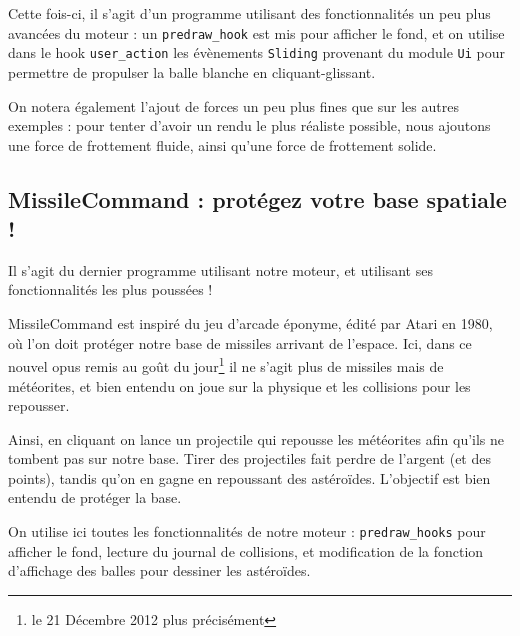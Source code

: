 \documentclass[a4paper]{scrartcl}
\begin{document}
Cette fois-ci, il s'agit d'un programme utilisant des fonctionnalités
un peu plus avancées du moteur : un \texttt{predraw\_hook} est mis
pour afficher le fond, et on utilise dans le hook
\texttt{user\_action} les évènements \texttt{Sliding} provenant du
module \texttt{Ui} pour permettre de propulser la balle blanche en
cliquant-glissant.

On notera également l'ajout de forces un peu plus fines que sur les
autres exemples : pour tenter d'avoir un rendu le plus réaliste
possible, nous ajoutons une force de frottement fluide, ainsi qu'une
force de frottement solide.

\subsection{MissileCommand : protégez votre base spatiale !}

Il s'agit du dernier programme utilisant notre moteur, et utilisant
ses fonctionnalités les plus poussées !

MissileCommand est inspiré du jeu d'arcade éponyme, édité par Atari en
1980, où l'on doit protéger notre base de missiles arrivant de
l'espace. Ici, dans ce nouvel opus remis au goût du jour\footnote{le
  21 Décembre 2012 plus précisément} il ne s'agit plus de missiles
mais de météorites, et bien entendu on joue sur la physique et les
collisions pour les repousser.

Ainsi, en cliquant on lance un projectile qui repousse les météorites
afin qu'ils ne tombent pas sur notre base. Tirer des projectiles fait
perdre de l'argent (et des points), tandis qu'on en gagne en
repoussant des astéroïdes. L'objectif est bien entendu de protéger la
base.

On utilise ici toutes les fonctionnalités de notre moteur :
\texttt{predraw\_hooks} pour afficher le fond, lecture du journal de
collisions, et modification de la fonction d'affichage des balles pour
dessiner les astéroïdes.
\end{document}
